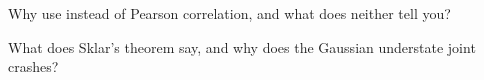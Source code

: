 \begin{interviewq}\label{iq:qm:robust-statistics-and-heavy-tails:5}
Why use  instead of Pearson correlation, and what does neither tell you?
\end{interviewq}

\begin{interviewq}\label{iq:qm:robust-statistics-and-heavy-tails:6}
What does Sklar's theorem say, and why does the Gaussian  understate joint crashes?
\end{interviewq}
